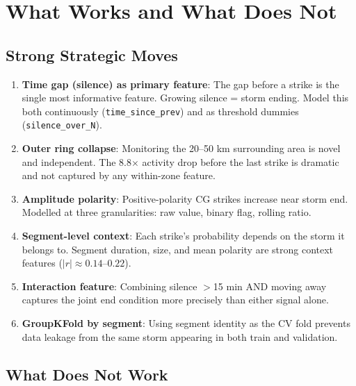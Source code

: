\documentclass[12pt,a4paper]{article}
\begin{document}
\section{What Works and What Does Not}

\subsection{Strong Strategic Moves}

\begin{enumerate}[leftmargin=1.5em]
  \item \textbf{Time gap (silence) as primary feature}: The gap before a strike is the
        single most informative feature. Growing silence = storm ending. Model this both
        continuously (\texttt{time\_since\_prev}) and as threshold dummies (\texttt{silence\_over\_N}).

  \item \textbf{Outer ring collapse}: Monitoring the 20--50 km surrounding area is novel
        and independent. The 8.8$\times$ activity drop before the last strike is dramatic
        and not captured by any within-zone feature.

  \item \textbf{Amplitude polarity}: Positive-polarity CG strikes increase near storm end.
        Modelled at three granularities: raw value, binary flag, rolling ratio.

  \item \textbf{Segment-level context}: Each strike's probability depends on the storm it
        belongs to. Segment duration, size, and mean polarity are strong context features
        ($|r| \approx 0.14$--$0.22$).

  \item \textbf{Interaction feature}: Combining silence $>$15 min AND moving away captures
        the joint end condition more precisely than either signal alone.

  \item \textbf{GroupKFold by segment}: Using segment identity as the CV fold prevents
        data leakage from the same storm appearing in both train and validation.
\end{enumerate}

\subsection{What Does Not Work}
\end{document}
